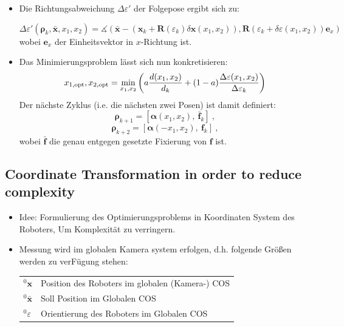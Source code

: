 \documentclass[10pt,a4paper]{article}
\begin{document}
\begin{itemize}
	\item Die Richtungsabweichung $\Delta \varepsilon'$ der Folgepose ergibt sich zu:
	
	\begin{equation}
	\Delta \varepsilon' (\bm{\rho}_k, \bar{\bm{x}}, x_1, x_2) = \measuredangle\left( \bar{\bm{x}} - \left(\bm{x}_{k} + \bm{R}(\varepsilon_k) \delta \bm{x}(x_1,x_2) \right), \bm{R}(\varepsilon_k + \delta \varepsilon (x_1, x_2)) \bm{e}_x \right)
	\end{equation}	
	wobei $\bm{e}_x$ der Einheitsvektor in $x$-Richtung ist.
	
	\item Das Minimierungsproblem lässt sich nun konkretisieren:
	\begin{equation}
	x_{1, \textnormal{opt}}, x_{2, \textnormal{opt}} = \min_{x_1, x_2} \left( a \frac{d(x_1, x_2)}{d_k} + (1-a)\frac{\Delta \varepsilon (x_1, x_2)}{\Delta \varepsilon_k} \right)	
	\end{equation}
	Der nächste Zyklus (i.e. die nächsten zwei Posen) ist damit definiert: 
	\begin{equation}
	\bm{\rho}_{k+1} = [\bm{\alpha}(x_1, x_2),~ \bar{\bm{f}}_k]~,
	\end{equation}
	\begin{equation}
	\bm{\rho}_{k+2} = [\bm{\alpha}(-x_1, x_2),~ {\bm{f}}_k]~,
	\end{equation}
	wobei $\bar{\bm{f}}$ die genau entgegen gesetzte Fixierung von $\bm{f}$ ist.
	
	
\end{itemize}


\subsection{Coordinate Transformation in order to reduce complexity}

\begin{itemize}
	\item Idee: Formulierung des Optimierungsproblems in Koordinaten System des Roboters, Um Komplexität zu verringern.
	\item Messung wird im globalen Kamera system erfolgen, d.h. folgende Größen werden zu verFügung stehen:
	
	\begin{tabular}{ll}
	$^0\bm{x}$ & Position des Roboters im globalen (Kamera-) COS \\
	$^0\bar{\bm{x}}$ & Soll Position im Globalen COS \\
	$^0\varepsilon$ & Orientierung des Roboters im Globalen COS \\
	
	\end{tabular}
	
\end{itemize}
\end{document}
